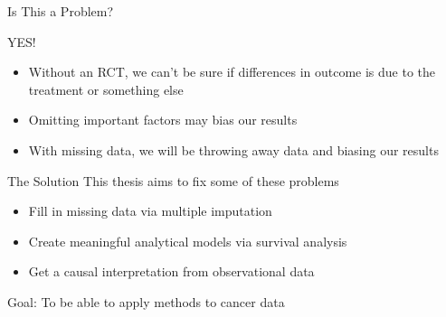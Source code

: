 \begin{frame}{Is This a Problem?}

\begin{center}
 {\Huge{YES!}}
\end{center}
  \begin{itemize}
   \item Without an RCT, we can't be sure if differences in outcome is due to the treatment or something else
   \item Omitting important factors may bias our results
   \item With missing data, we will be throwing away data and biasing our results
  \end{itemize}


\end{frame}

\begin{frame}{The Solution}
This thesis aims to fix some of these problems
  \begin{itemize}
   \item Fill in missing data via multiple imputation
   \item Create meaningful analytical models via survival analysis
   \item Get a causal interpretation from observational data
  \end{itemize}
Goal: To be able to apply methods to cancer data

\end{frame}

\begin{comment}
 

\begin{frame}{Motivation}
\begin{itemize}
   \item This thesis is motivated by cancer survival data with moderate missingness
   \item We will build the theory for dealing with this situation
   \item And then apply it to a cancer data set
  \end{itemize}


\end{frame}

\begin{frame}{Abstract}
In this thesis, multiple imputation, survival analysis, and propensity score analysis are combined in 
order to answer questions about cancer data with moderate missingness. While each of these fields have 
been studied individually, there has been little work and analysis on using the three in trio.
Starting with an incomplete dataset, we aim to impute the missing data, run survival analysis on each
of the imputed datasets, and then do propensity score analysis to observe causal effects.
Along the way, many theoretical and analytical decisions are made. I explain why each decision is made, 
and offer ample evidence for the other choices such that the interested reader may implement the methods
if they so choose. I apply the methodology to a cancer survival dataset in a case study, but the methods 
used are general, and could be adapted for any type of data.
 
\end{frame}
\end{comment}
